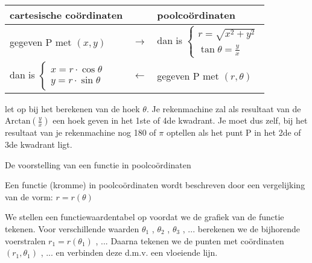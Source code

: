 \begin{minipage}{.48\linewidth}
	\begin{tabular}{lcl}
		cartesische co\"ordinaten &  & poolco\"ordinaten  \\
		\hline
		gegeven P met $\left(x,y\right)$ & $\rightarrow$ & dan is $\begin{cases}
		r=\sqrt{x^{2}+y^{2}}\\
		\tan\theta=\frac{y}{x}
		\end{cases}$  \\
		dan is $\begin{cases}
		x=r\cdot\cos\theta\\
		y=r\cdot\sin\theta
		\end{cases}$ & $\leftarrow$ & gegeven P met $\left(r,\theta\right)$ \\
	\end{tabular}
\end{minipage}
\hspace{1cm}
\begin{minipage}{.48\linewidth}
	\centering
		
\end{minipage}

\vspace{1cm}

\begin{opmerking}
let op bij het berekenen van de hoek $\theta$. Je rekenmachine
zal als resultaat van de $\textrm{Arctan}\left(\frac{y}{x}\right)$
een hoek geven in het 1ste of 4de kwadrant. Je moet dus zelf, bij
het resultaat van je rekenmachine nog 180\textdegree{} of $\pi$ optellen
als het punt P in het 2de of 3de kwadrant ligt.
\end{opmerking}

De voorstelling van een functie in poolco\"ordinaten

Een functie (kromme) in poolco\"ordinaten wordt beschreven
door een vergelijking van de vorm: $r=r(\theta)$


We stellen een functiewaardentabel op voordat we de grafiek
van de functie tekenen. Voor verschillende waarden $\theta_{1}$ ,
$\theta_{2}$ , $\theta_{3}$ , ... berekenen we de bijhorende voerstralen
$r_{1}=r\left(\theta_{1}\right)$ , ... Daarna tekenen we de punten
met co\"ordinaten $\left(r_{1},\theta_{1}\right)$ , ... en verbinden
deze d.m.v. een vloeiende lijn.


